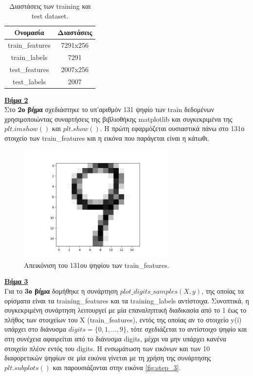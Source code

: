\documentclass[11pt]{article} %
\begin{document}
\begin{table}[h]
\begin{center}
\begin{tabular}{c c }
\hline\hline
Ονομασία & Διαστάσεις \\
\hline
train\_features & 7291x256\\ 
train\_labels     & 7291      \\  
test\_features  & 2007x256\\
test\_labels      & 2007\\
\hline 
\end{tabular}
\caption{Διαστάσεις των training και test dataset.}
\end{center}
\end{table}

\underline{\textbf{Βήμα 2}}\\

Στο \textbf{2ο βήμα} σχεδιάστηκε το υπ'αριθμόν 131 ψηφίο των train δεδομένων χρησιμοποιώντας συναρτήσεις της βιβλιοθήκης matplotlib και συγκεκριμένα της $plt.imshow()$ και $plt.show()$. Η πρώτη εφαρμόζεται ουσιαστικά πάνω στο 131ο στοιχείο των train\_features και η εικόνα που παράγεται είναι η κάτωθι.

\begin{figure}[H]
    \centering
    \includegraphics[width=0.7\textwidth]{plots/Step 2}
    \caption{Απεικόνιση του 131ου ψηφίου των train\_features.}
    \label{fig:step_2}
\end{figure}

\underline{\textbf{Βήμα 3}}\\

Για το \textbf{3ο βήμα} δομήθηκε η συνάρτηση $plot\_digits\_samples(X, y)$, της οποίας τα ορίσματα είναι τα training\_features και τα training\_labels αντίστοιχα. Συνοπτικά, η συγκεκριμένη συνάρτηση λειτουργεί με μία επαναληπτική διαδικασία από το 1 έως το πλήθος των στοιχείων του X (train\_features), εντός της οποίας αν το στοιχείο y(i) υπάρχει στο διάνυσμα $digits = \{0,1,...,9\}$, τότε σχεδιάζεται το αντίστοιχο ψηφίο και στη συνέχεια αφαιρείται από το διάνυσμα digits, μέχρι να μην υπάρχει κανένα στοιχείο πλέον εντός του digits. Η ενσωμάτωση των εικόνων και των 10 διαφορετικών ψηφίων σε μία εικόνα γίνεται με τη χρήση της συνάρτησης $plt.subplots()$ και παρουσιάζονται στην εικόνα \ref{fig:step_3}.
\end{document}

